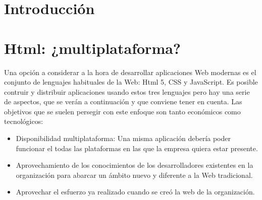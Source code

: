 \documentclass[
10pt, %
a4paper, %
oneside, %
headinclude,footinclude, %
BCOR5mm, %
]{scrartcl}
\begin{document}
{\let\thefootnote\relax{}}

{\let\thefootnote\relax{}}


\newpage %

\section{Introducción}

\section{Html: ¿multiplataforma?}
Una opción a considerar a la hora de desarrollar aplicaciones Web modernas es el conjunto de lenguajes habituales de la Web: Html 5, CSS y JavaScript. Es posible contruir y distribuir aplicaciones usando estos tres lenguajes pero hay una serie de aspectos, que se verán a continuación y que conviene tener en cuenta. Las objetivos que se suelen persegir con este enfoque son tanto económicos como tecnológicos: 

\begin{itemize}
\item Disponibilidad multiplataforma: Una misma aplicación debería poder funcionar el todas las plataformas en las que la empresa quiera estar presente.
\item Aprovechamiento de los conocimientos de los desarrolladores existentes en la organización para abarcar un ámbito nuevo y diferente a la Web tradicional.
\item Aprovechar el esfuerzo ya realizado cuando se creó la web de la organización.
\end{itemize}
\end{document}
